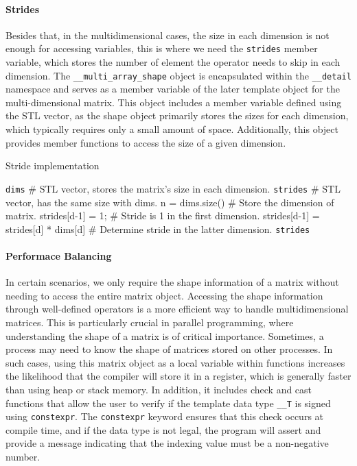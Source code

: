 \paragraph{Strides} 
Besides that, in the multidimensional cases, the size in each dimension is not enough for accessing 
variables, this is where we need the \texttt{strides} member variable, which stores the 
number of element the operator needs to skip in each dimension.
The \texttt{\_\_multi\_array\_shape} object is encapsulated within 
the \texttt{\_\_detail} namespace and serves as a member variable of the later template object for the multi-dimensional matrix. 
This object includes a member variable defined using the STL vector, as the shape object primarily stores the sizes for each dimension, 
which typically requires only a small amount of space. 
Additionally, this object provides member functions to access the size of a given dimension. 
\begin{algorithm}
  \caption{Stride implementation}
  \begin{algorithmic}[1]
    \STATE \texttt{dims}    \hfill \# STL vector, stores the matrix's size in each dimension.
    \STATE \texttt{strides} \hfill \# STL vector, has the same size with dims.
    \STATE n = dims.size()  \hfill \# Store the dimension of matrix.
    \STATE strides[d-1] = 1; \hfill \# Stride is 1 in the first dimension.
      \STATE strides[d-1] = strides[d] * dims[d] \hfill \# Determine stride in the latter dimension.
    \ENDFOR
    \RETURN \texttt{strides}
  \end{algorithmic}
\end{algorithm}


\paragraph{Performace Balancing}
In certain scenarios, 
we only require the shape information of a matrix without needing to access the entire matrix object. 
Accessing the shape information through well-defined operators is a more efficient way to 
handle multidimensional matrices. 
This is particularly crucial in parallel programming, where understanding 
the shape of a matrix is of critical importance. 
Sometimes, a process may need to know the shape of matrices stored on other processes. 
In such cases, using this matrix object as a local variable within functions increases the 
likelihood that the compiler will store it in a register, 
which is generally faster than using heap or stack memory.
In addition, it includes check and cast functions that allow the user to verify if the template data type \texttt{\_\_T} is signed using \texttt{constexpr}. 
The \texttt{constexpr} keyword ensures that this check occurs at compile time, and if the data type is not legal, 
the program will assert and provide a message indicating that the indexing value must be a non-negative number. 


